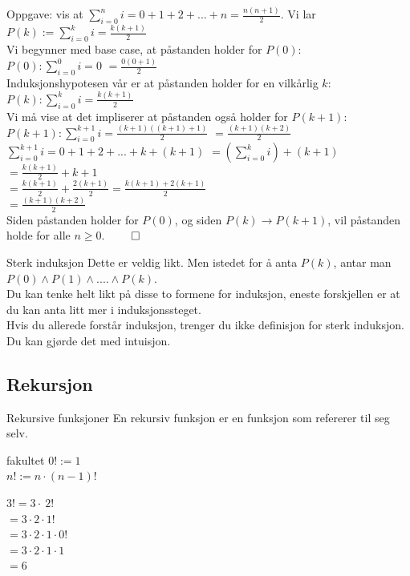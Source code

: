 \begin{frame}{Oppgave: vis at $\sum_{i=0}^{n} i = 0 + 1 + 2 + ... + n = \frac{n(n+1)}{2}$.}
    \pause    
    Vi lar $P(k) := \sum_{i=0}^{k} i = \frac{k(k+1)}{2}$\\

    \pause
    Vi begynner med base case, at påstanden holder for $P(0)$:\\
    $P(0): \sum_{i=0}^{0} i = 0$ \pause $ = \frac{0(0+1)}{2}$ \checkmark\\
    
    \pause
    Induksjonshypotesen vår er at påstanden holder for en vilkårlig $k$: \\
    $P(k): \sum_{i=0}^{k} i = \frac{k(k+1)}{2}$\\
    \pause
    Vi må vise at det impliserer at påstanden også holder for $P(k+1)$:\\
    $P(k+1): \sum_{i=0}^{k+1} i = \frac{(k+1)((k+1)+1)}{2}$ \pause $ = \frac{(k+1)(k+2)}{2}$\\

    \pause
    $\sum_{i=0}^{k+1} i = 0 + 1 + 2 + ... + k + (k+1)$ \pause $= (\sum_{i=0}^{k} i )+ (k+1)$\\
    \pause
    $=\frac{k(k+1)}{2} + k + 1$\\
    \pause
    $= \frac{k(k+1)}{2}+\frac{2(k+1)}{2} = \frac{k(k+1)+2(k+1)}{2}$\\
    \pause
    $= \frac{(k+1)(k+2)}{2}$ \pause \checkmark \\[2mm]
    \pause
    Siden påstanden holder for $P(0)$, og siden $P(k) \rightarrow P(k+1)$, vil påstanden holde for alle $n \geq 0$. $\qed$
\end{frame}

\begin{frame}{Sterk induksjon}
    Dette er veldig likt. Men istedet for å anta $P(k)$, antar man $P(0) \land P(1) \land .... \land P(k)$.\\
    Du kan tenke helt likt på disse to formene for induksjon, eneste forskjellen er at du kan anta litt mer i induksjonssteget.\\

    Hvis du allerede forstår induksjon, trenger du ikke definisjon for sterk induksjon. Du kan gjørde det med intuisjon.
\end{frame}

\subsection{Rekursjon}
\begin{frame}{Rekursive funksjoner}
    En rekursiv funksjon er en funksjon som refererer til seg selv.
    \pause
    \begin{block}{fakultet}
        $0! := 1$ \\
        $n! := n \cdot (n-1)!$
    \end{block}    
    \pause 
    $3! = 3 \cdot ~ 2!$\\
    $= 3 \cdot 2 \cdot 1!$\\
    $= 3 \cdot 2 \cdot 1 \cdot 0!$\\
    $= 3 \cdot 2 \cdot 1 \cdot 1$\\
    $= 6$
\end{frame}

